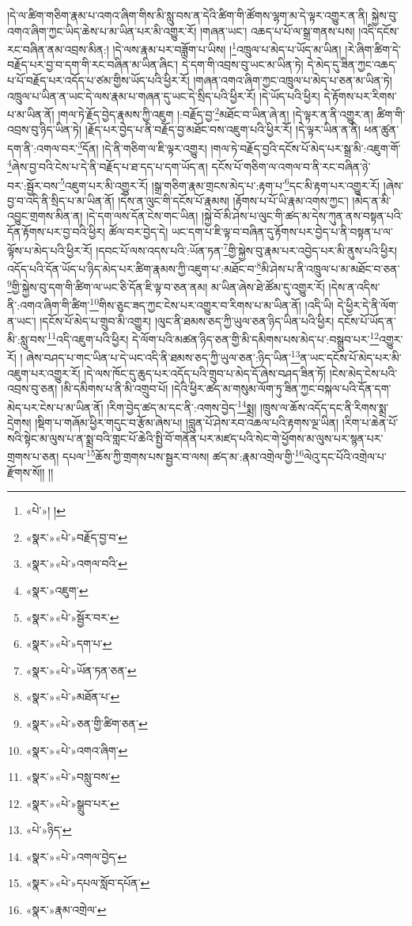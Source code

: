 །དེ་ལ་ཚིག་གཅིག་རྣམ་པ་འགའ་ཞིག་གིས་མི་སླུ་བས་ན་དེའི་ཚིག་གི་ཚོགས་ལྷག་མ་དེ་ལྟར་འགྱུར་ན་ནི། སྐྱེས་བུ་འགའ་ཞིག་ཀྱང་ཡིད་ཆེས་པ་མ་ཡིན་པར་མི་འགྱུར་རོ། །གཞན་ཡང་། འཆད་པ་པོ་ལ་སྒྲ་གནས་པས། །འདི་དངོས་རང་བཞིན་ནམ་འབྲས་མིན:། །དེ་ལས་རྣམ་པར་བཟློག་པ་ཡིས། །\footnote{«པེ་»། །}འཁྲུལ་པ་མེད་པ་ཡོད་མ་ཡིན། །རེ་ཞིག་ཚིག་དེ་བརྗོད་པར་བྱ་བ་དག་གི་རང་བཞིན་མ་ཡིན་ཞིང་། དེ་དག་གི་འབྲས་བུ་ཡང་མ་ཡིན་ཏེ། དེ་མེད་དུ་ཟིན་ཀྱང་འཆད་པ་པོ་བརྗོད་པར་འདོད་པ་ཙམ་གྱིས་ཡོད་པའི་ཕྱིར་རོ། །གཞན་འགའ་ཞིག་ཀྱང་འཁྲུལ་པ་མེད་པ་ཅན་མ་ཡིན་ཏེ། འཁྲུལ་པ་ཡིན་ན་ཡང་དེ་ལས་རྣམ་པ་གཞན་དུ་ཡང་དེ་སྲིད་པའི་ཕྱིར་རོ། །དེ་ཡོད་པའི་ཕྱིར། དེ་རྟོགས་པར་རིགས་པ་མ་ཡིན་ནོ། །གལ་ཏེ་རྗོད་བྱེད་རྣམས་ཀྱི་འཇུག །:བརྗོད་བྱ་\footnote{«སྣར་»«པེ་»བརྗོད་བྱ་བ་}མཐོང་བ་ཡིན་ཞེ་ན། །དེ་ལྟར་ན་ནི་འགྱུར་ན། ཚིག་གི་འབྲས་བུ་ཉིད་ཡིན་ཏེ། །རྗོད་པར་བྱེད་པ་ནི་བརྗོད་བྱ་མཐོང་བས་འཇུག་པའི་ཕྱིར་རོ། །དེ་ལྟར་ཡིན་ན་ནི། ཕན་ཚུན་དག་ནི་:འགལ་བར་\footnote{«སྣར་»«པེ་»འགལ་བའི་}དོན། །དེ་ནི་གཅིག་ལ་ཇི་ལྟར་འགྱུར། །གལ་ཏེ་བརྗོད་བྱའི་དངོས་པོ་མེད་པར་སྒྲ་མི་:འཇུག་གོ་\footnote{«སྣར་»འཇུག་}ཞེས་བྱ་བའི་ངེས་པ་དེ་ནི་བརྗོད་པ་ཐ་དད་པ་དག་ཡོད་ན། དངོས་པོ་གཅིག་ལ་འགལ་བ་ནི་རང་བཞིན་ཉེ་བར་:སྦྱོར་བས་\footnote{«སྣར་»«པེ་»སྦྱོར་བར་}འཇུག་པར་མི་འགྱུར་རོ། །སྒྲ་གཅིག་རྣམ་གྲངས་མེད་པ་:རྟག་པ་\footnote{«སྣར་»«པེ་»དག་པ་}དང་མི་རྟག་པར་འགྱུར་རོ། །ཞེས་བྱ་བ་འདི་ནི་སྲིད་པ་མ་ཡིན་ནོ། །དེས་ན་ལུང་གི་དངོས་པོ་རྣམས། །རྟོགས་པ་པོ་ཡི་རྣམ་འགས་ཀྱང་། །མེད་ན་མི་འབྱུང་གྲགས་མིན་ན། །དེ་དག་ལས་དོན་ངེས་གང་ཡིན། །སྐྱེ་བོ་མི་ཤེས་པ་ལུང་གི་ཚད་མ་དེས་ཀུན་ནས་བསྟན་པའི་དོན་རྟོགས་པར་བྱ་བའི་ཕྱིར། ཚོལ་བར་བྱེད་དེ། ཡང་དག་པ་ཇི་ལྟ་བ་བཞིན་དུ་རྟོགས་པར་བྱེད་པ་ནི་བསྟན་པ་ལ་ལྟོས་པ་མེད་པའི་ཕྱིར་རོ། །དབང་པོ་ལས་འདས་པའི་:ཡོན་ཏན་\footnote{«སྣར་»«པེ་»ཡོན་ཏན་ཅན་}གྱི་སྐྱེས་བུ་རྣམ་པར་འབྱེད་པར་མི་ནུས་པའི་ཕྱིར། འདོད་པའི་དོན་ཡོད་པ་ཉིད་མེད་པར་ཚིག་རྣམས་ཀྱི་འཇུག་པ་:མཐོང་བ་\footnote{«སྣར་»«པེ་»མཐོན་པ་}མི་ཤེས་པ་ནི་འཁྲུལ་པ་མ་མཐོང་བ་ཅན་\footnote{«སྣར་»«པེ་»ཅན་གྱི་ཚིག་ཅན་}གྱི་སྐྱེས་བུ་དག་གི་ཚིག་ལ་ཡང་ཅི་དོན་ཇི་ལྟ་བ་ཅན་ནམ། མ་ཡིན་ཞེས་ཐེ་ཚོམ་དུ་འགྱུར་རོ། །དེས་ན་འདིས་ནི་:འགའ་ཞིག་གི་ཚིག་\footnote{«སྣར་»«པེ་»འགའ་ཞིག་}གིས་ཅུང་ཟད་ཀྱང་ངེས་པར་འགྱུར་བ་རིགས་པ་མ་ཡིན་ནོ། །འདི་ཡི། དེ་ཕྱིར་དེ་ནི་ལོག་ན་ཡང་། །དངོས་པོ་མེད་པ་གྲུབ་མི་འགྱུར། །ལུང་ནི་ཐམས་ཅད་ཀྱི་ཡུལ་ཅན་ཉིད་ཡིན་པའི་ཕྱིར། དངོས་པོ་ཡོད་ན་མི་:སླུ་བས་\footnote{«སྣར་»«པེ་»བསླུ་བས་}འདི་འཇུག་པའི་ཕྱིར། དེ་ལོག་པའི་མཚན་ཉིད་ཅན་གྱི་མི་དམིགས་པས་མེད་པ་:བསྒྲུབ་པར་\footnote{«སྣར་»«པེ་»སྒྲུབ་པར་}འགྱུར་རོ། །
ཞེས་བཤད་པ་གང་ཡིན་པ་དེ་ཡང་འདི་ནི་ཐམས་ཅད་ཀྱི་ཡུལ་ཅན་:ཉིད་ཡིན་\footnote{«པེ་»ཉིད་}ན་ཡང་དངོས་པོ་མེད་པར་མི་འཇུག་པར་འགྱུར་རོ། །དེ་ལས་ཁོང་དུ་ཆུད་པར་འདོད་པའི་གྲུབ་པ་མེད་དོ་ཞེས་བཤད་ཟིན་ཏོ། །ངེས་མེད་ངེས་པའི་འབྲས་བུ་ཅན། །མི་དམིགས་པ་ནི་མི་འགྲུབ་པོ། །དེའི་ཕྱིར་ཚད་མ་གསུམ་ལོག་ཏུ་ཟིན་ཀྱང་བསྐལ་པའི་དོན་དག་མེད་པར་ངེས་པ་མ་ཡིན་ནོ། །རིག་བྱེད་ཚད་མ་དང་ནི་:འགས་བྱེད་\footnote{«སྣར་»«པེ་»འགལ་བྱེད་}སྨྲ། །ཁྲུས་ལ་ཆོས་འདོད་དང་ནི་རིགས་སྨྲ་དྲེགས། །སྡིག་པ་གཞོམ་ཕྱིར་གདུང་བ་རྩོམ་ཞེས་པ། །བླུན་པོ་ཤེས་རབ་འཆལ་པའི་རྟགས་ལྔ་ཡིན། །རིག་པ་ཆེན་པོ་སའི་སྟེང་མ་ལུས་པ་ན་སྨྲ་བའི་གླང་པོ་ཆེའི་སྤྱི་བོ་གནོན་པར་མཛད་པའི་སེང་གེ་ཕྱོགས་མ་ལུས་པར་སྙན་པར་གྲགས་པ་ཅན། དཔལ་\footnote{«སྣར་»«པེ་»དཔལ་སློབ་དཔོན་}ཆོས་ཀྱི་གྲགས་པས་སྦྱར་བ་ལས། ཚད་མ་:རྣམ་འགྲེལ་གྱི་\footnote{«སྣར་»རྣམ་འགྲེལ་}ལེའུ་དང་པོའི་འགྲེལ་པ་རྫོགས་སོ།། །།